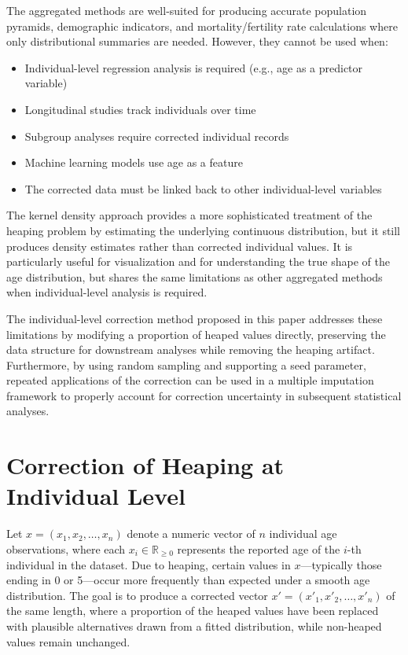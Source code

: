 \documentclass[12pt]{article}
\theoremstyle{plain}
\theoremstyle{definition}
\begin{document}
The aggregated methods are well-suited for producing accurate population pyramids, demographic indicators, and mortality/fertility rate calculations where only distributional summaries are needed. However, they cannot be used when:

\begin{itemize}
    \item Individual-level regression analysis is required (e.g., age as a predictor variable)
    \item Longitudinal studies track individuals over time
    \item Subgroup analyses require corrected individual records
    \item Machine learning models use age as a feature
    \item The corrected data must be linked back to other individual-level variables
\end{itemize}

The kernel density approach \citep{kernelheaping} provides a more sophisticated treatment of the heaping problem by estimating the underlying continuous distribution, but it still produces density estimates rather than corrected individual values. It is particularly useful for visualization and for understanding the true shape of the age distribution, but shares the same limitations as other aggregated methods when individual-level analysis is required.

The individual-level correction method proposed in this paper addresses these limitations by modifying a proportion of heaped values directly, preserving the data structure for downstream analyses while removing the heaping artifact. Furthermore, by using random sampling and supporting a seed parameter, repeated applications of the correction can be used in a multiple imputation framework to properly account for correction uncertainty in subsequent statistical analyses.


\section{Correction of Heaping at Individual Level}

Let $x = (x_1, x_2, \ldots, x_n)$ denote a numeric vector of $n$ individual age
observations, where each $x_i \in \mathbb{R}_{\geq 0}$ represents the reported
age of the $i$-th individual in the dataset. Due to heaping, certain values in $x$---typically those ending in 0 or 5---occur more frequently than expected under a smooth age distribution. The goal is to produce a corrected vector $x' = (x'_1, x'_2, \ldots, x'_n)$ of the same length, where a proportion of the heaped values have been replaced with plausible alternatives drawn from a fitted distribution, while non-heaped values remain unchanged.
\end{document}
